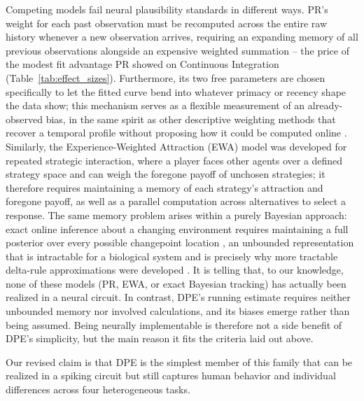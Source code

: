 \begin{ms}
Competing models fail neural plausibility standards in different ways. PR's weight for each past observation must be recomputed across the entire raw history whenever a new observation arrives, requiring an expanding memory of all previous observations alongside an expensive weighted summation -- the price of the modest fit advantage PR showed on Continuous Integration (Table~\ref{tab:effect_sizes}). Furthermore, its two free parameters are chosen specifically to let the fitted curve bend into whatever primacy or recency shape the data show; this mechanism serves as a flexible measurement of an already-observed bias, in the same spirit as other descriptive weighting methods that recover a temporal profile without proposing how it could be computed online \citep{anderson1965primacy, levi2018strategic, okazawa2018psychophysical}. Similarly, the Experience-Weighted Attraction (EWA) model \citep{camerer1999experience, ho2007selftuning} was developed for repeated strategic interaction, where a player faces other agents over a defined strategy space and can weigh the foregone payoff of unchosen strategies; it therefore requires maintaining a memory of each strategy's attraction and foregone payoff, as well as a parallel computation across alternatives to select a response. The same memory problem arises within a purely Bayesian approach: exact online inference about a changing environment requires maintaining a full posterior over every possible changepoint location \citep{adams2007bayesian}, an unbounded representation that is intractable for a biological system and is precisely why more tractable delta-rule approximations were developed \citep{wilson2013mixture}. It is telling that, to our knowledge, none of these models (PR, EWA, or exact Bayesian tracking) has actually been realized in a neural circuit. In contrast, DPE's running estimate requires neither unbounded memory nor involved calculations, and its biases emerge rather than being assumed. Being neurally implementable is therefore not a side benefit of DPE's simplicity, but the main reason it fits the criteria laid out above.
\end{ms}

Our revised claim is that DPE is the simplest member of this family that can be realized in a spiking circuit but still captures human behavior and individual differences across four heterogeneous tasks.

